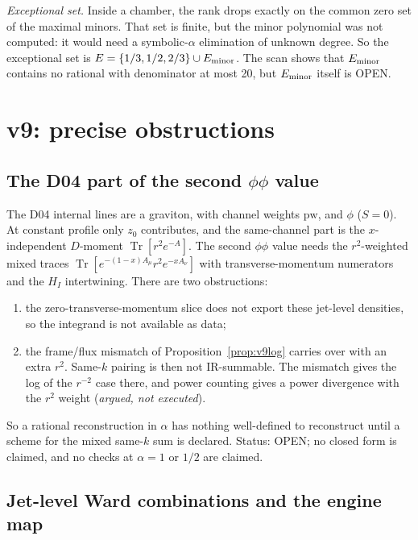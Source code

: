 \documentclass[11pt,a4paper]{article}
\newcommand{\Tr}{\operatorname{Tr}}
\newcommand{\OPEN}{\textsf{OPEN}}
\theoremstyle{plain}
\theoremstyle{definition}
\theoremstyle{remark}
\numberwithin{equation}{section}
\begin{document}
\noindent\emph{Exceptional set.} Inside a chamber, the rank drops
exactly on the common zero set of the maximal minors. That set is
finite, but the minor polynomial was not computed: it would need a
symbolic-\(\alpha\) elimination of unknown degree. So the
exceptional set is \(E=\{1/3,1/2,2/3\}\cup E_{\rm minor}\). The
scan shows that \(E_{\rm minor}\) contains no rational with
denominator at most 20, but \(E_{\rm minor}\) itself is \OPEN.

\section{v9: precise obstructions}
\label{sec:v9obs}

\subsection{The D04 part of the second \texorpdfstring{\(\phi\phi\)}{phi phi} value}
\label{sec:v9D04}

The D04 internal lines are a graviton, with channel weights
\(\mathrm{pw}\), and \(\phi\) (\(S=0\)). At constant profile only
\(z_0\) contributes, and the same-channel part is the
\(x\)-independent \(D\)-moment
\(\Tr[r^2e^{-A}]\). The second \(\phi\phi\) value needs the
\(r^2\)-weighted mixed traces
\(\Tr[e^{-(1-x)A_\mu}r^2e^{-xA_\nu}]\) with transverse-momentum
numerators and the \(H_I\) intertwining. There are two
obstructions:
\begin{enumerate}[label=(\alph*)]
\item the zero-transverse-momentum slice does not export these
jet-level densities, so the integrand is not available as data;
\item the frame/flux mismatch of Proposition~\ref{prop:v9log} carries
over with an extra \(r^2\). Same-\(k\) pairing is then not
IR-summable. The mismatch gives the log of the \(r^{-2}\) case
there, and power counting gives a power divergence with the
\(r^2\) weight (\emph{argued, not executed}).
\end{enumerate}
So a rational reconstruction in \(\alpha\) has nothing
well-defined to reconstruct until a scheme for the mixed
same-\(k\) sum is declared. Status: \OPEN; no closed form is
claimed, and no checks at \(\alpha=1\) or \(1/2\) are claimed.

\subsection{Jet-level Ward combinations and the engine map}
\label{sec:v9jet}
\end{document}
